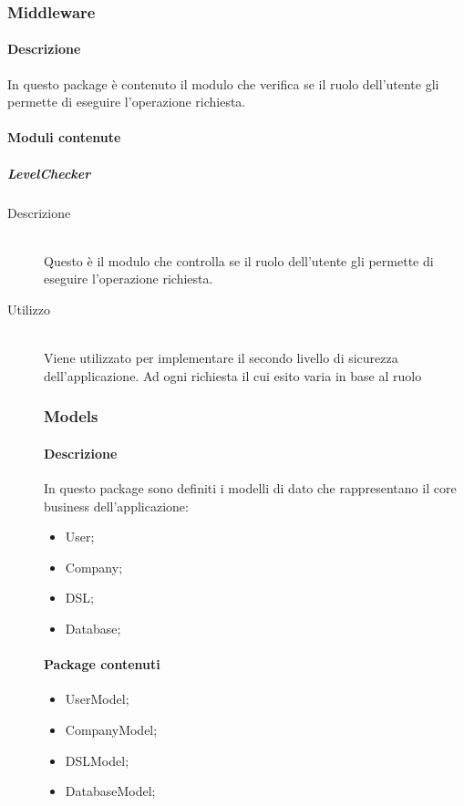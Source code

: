 \subsubsection{Middleware}
\paragraph{Descrizione}
In questo package è contenuto il modulo che verifica se il ruolo dell'utente gli permette di eseguire l'operazione richiesta.
\paragraph{Moduli contenute}
\subparagraph{LevelChecker}
\begin{description}
\item[Descrizione] \hfill \\
Questo è il modulo che controlla se il ruolo dell'utente gli permette di eseguire l'operazione richiesta.
\item[Utilizzo] \hfill \\
Viene utilizzato per implementare il secondo livello di sicurezza dell'applicazione. Ad ogni richiesta il cui esito varia in base al ruolo

\subsubsection{Models}
\paragraph{Descrizione}
In questo package sono definiti i modelli di dato che rappresentano il core business dell'applicazione:
\begin{itemize}
\item User;
\item Company;
\item DSL;
\item Database;
\end{itemize}
\paragraph{Package contenuti}
\begin{itemize}
\item UserModel;
\item CompanyModel;
\item DSLModel;
\item DatabaseModel;
\end{itemize}


\end{description}
